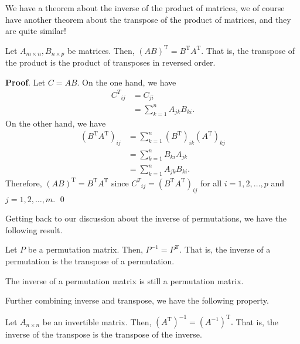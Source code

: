 \documentclass[11pt]{article}
\theoremstyle{break}
\theoremstyle{no_label}
\newcommand{\transpose}{\text{T}}
\numberwithin{equation}{section}
\begin{document}
We have a theorem about the inverse of the product of matrices, we of course have another theorem about the transpose of the product of matrices, and they are quite similar!

\begin{theorem}
    Let $A_{m\times n}, B_{n\times p}$ be matrices. Then, $(AB)^{\transpose}=B^{\transpose}A^{\transpose}.$ That is, the transpose of the product is the product of transposes in reversed order.
\end{theorem}
\textbf{Proof}. Let $C=AB$. On the one hand, we have \begin{align*}
    {C^T}_{ij}&=C_{ji}\\
    &=\sum_{k=1}^{n}A_{jk}B_{ki}.
\end{align*} On the other hand, we have \begin{align*}
    (B^\transpose A^\transpose)_{ij}&=\sum_{k=1}^{n}(B^\transpose)_{ik}(A^\transpose)_{kj}\\
    &=\sum_{k=1}^{n}B_{ki}A_{jk}\\
    &=\sum_{k=1}^{n}A_{jk}B_{ki}.
\end{align*} Therefore, $(AB)^{\transpose}=B^{\transpose}A^{\transpose}$ since ${C^T}_{ij}=(B^\transpose A^\transpose)_{ij}$ for all $i=1,2,\dots,p$ and $j=1,2,\dots,m$. \qed

Getting back to our discussion about the inverse of permutations, we have the following result.

\begin{theorem}
    Let $P$ be a permutation matrix. Then, $P^{-1}=P^\transpose.$ That is, the inverse of a permutation is the transpose of a permutation.
\end{theorem}

\begin{corollary}
    The inverse of a permutation matrix is still a permutation matrix.
\end{corollary}

Further combining inverse and transpose, we have the following property. 
\begin{theorem}
    Let $A_{n\times n}$ be an invertible matrix. Then, $(A^{\transpose})^{-1}=(A^{-1})^\transpose.$ That is, the inverse of the transpose is the transpose of the inverse.
\end{theorem}
\end{document}
